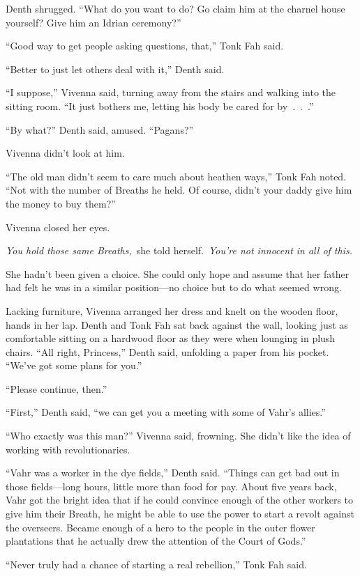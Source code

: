 Denth shrugged. “What do you want to do? Go claim him at the charnel house yourself? Give him an Idrian ceremony?”

“Good way to get people asking questions, that,” Tonk Fah said.

“Better to just let others deal with it,” Denth said.

“I suppose,” Vivenna said, turning away from the stairs and walking into the sitting room. “It just bothers me, letting his body be cared for by~.~.~.”

“By what?” Denth said, amused. “Pagans?”

Vivenna didn’t look at him.

“The old man didn’t seem to care much about heathen ways,” Tonk Fah noted. “Not with the number of Breaths he held. Of course, didn’t your daddy give him the money to buy them?”

Vivenna closed her eyes.

\textit{You hold those same Breaths,}~she told herself.~\textit{You’re not innocent in all of this.}

She hadn’t been given a choice. She could only hope and assume that her father had felt he was in a similar position—no choice but to do what seemed wrong.

Lacking furniture, Vivenna arranged her dress and knelt on the wooden floor, hands in her lap. Denth and Tonk Fah sat back against the wall, looking just as comfortable sitting on a hardwood floor as they were when lounging in plush chairs. “All right, Princess,” Denth said, unfolding a paper from his pocket. “We’ve got some plans for you.”

“Please continue, then.”

“First,” Denth said, “we can get you a meeting with some of Vahr’s allies.”

“Who exactly was this man?” Vivenna said, frowning. She didn’t like the idea of working with revolutionaries.

“Vahr was a worker in the dye fields,” Denth said. “Things can get bad out in those fields—long hours, little more than food for pay. About five years back, Vahr got the bright idea that if he could convince enough of the other workers to give him their Breath, he might be able to use the power to start a revolt against the overseers. Became enough of a hero to the people in the outer flower plantations that he actually drew the attention of the Court of Gods.”

“Never truly had a chance of starting a real rebellion,” Tonk Fah said.

